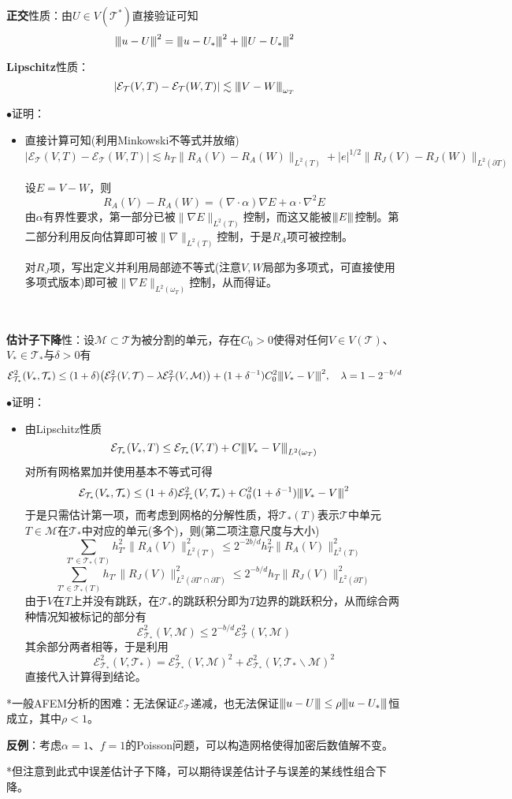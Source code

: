 \documentclass[a4paper,UTF8,fontset=windows]{ctexart}
\newcommand*{\ce}{\mathcal{E}}
\newcommand*{\ct}{\mathcal{T}}
\newcommand{\proo}[1]{{\kaishu $\bullet$证明：
\begin{itemize}
    \item[] #1
\end{itemize}
}}
\newcommand{\mm}[1]{{\left\vert\kern-0.25ex\left\vert\kern-0.25ex\left\vert #1 \right\vert\kern-0.25ex\right\vert\kern-0.25ex\right\vert}}
\begin{document}
\textbf{正交}性质：由$U\in V(\ct^*)$直接验证可知
$$\mm{u-U}^2=\mm{u-U_*}^2+\mm{U-U_*}^2$$

\textbf{Lipschitz}性质：
$$|\ce_\ct(V,T)-\ce_\ct(W,T)|\lesssim\mm{V-W}_{\omega_T}$$

\proo{
    直接计算可知(利用Minkowski不等式并放缩)
    $$|\ce_\ct(V,T)-\ce_\ct(W,T)|\lesssim h_T\|R_A(V)-R_A(W)\|_{L^2(T)}+|e|^{1/2}\|R_J(V)-R_J(W)\|_{L^2(\partial T)}$$

    设$E=V-W$，则
    $$R_A(V)-R_A(W)=(\nabla\cdot\alpha)\nabla E+\alpha\cdot\nabla^2E$$
    由$\alpha$有界性要求，第一部分已被$\|\nabla E\|_{L^2(T)}$控制，而这又能被$\mm{E}$控制。第二部分利用反向估算即可被$\|\nabla\|_{L^2(T)}$控制，于是$R_A$项可被控制。

    对$R_J$项，写出定义并利用局部迹不等式(注意$V,W$局部为多项式，可直接使用多项式版本)即可被$\|\nabla E\|_{L^2(\omega_T)}$控制，从而得证。
}

\

\textbf{估计子下降}性：设$\mathcal{M}\subset\ct$为被分割的单元，存在$C_0>0$使得对任何$V\in V(\ct)$、$V_*\in\ct_*$与$\delta>0$有
$$\ce_{\ct_*}^2(V_*,\ct_*)\le(1+\delta)\big(\ce_\ct^2(V,\ct)-\lambda\ce_\ct^2(V,\mathcal{M})\big)+(1+\delta^{-1})C_0^2\mm{V_*-V}^2,\quad\lambda=1-2^{-b/d}$$

\proo{
    由Lipschitz性质
    $$\ce_{\ct_*}(V_*,T)\le\ce_{\ct_*}(V,T)+C\mm{V_*-V}_{L^2(\omega_T)}$$
    对所有网格累加并使用基本不等式可得
    $$\ce_{\ct_*}(V_*,\ct_*)\le(1+\delta)\ce_{\ct_*}^2(V,\ct_*)+C_0^2(1+\delta^{-1})\mm{V_*-V}^2$$
    于是只需估计第一项，而考虑到网格的分解性质，将$\ct_*(T)$表示$\ct$中单元$T\in\mathcal{M}$在$\ct_*$中对应的单元(多个)，则(第二项注意尺度与大小)
    $$\sum_{T'\in\ct_*(T)}h_{T'}^2\|R_A(V)\|_{L^2(T')}^2\le 2^{-2b/d}h_T^2\|R_A(V)\|_{L^2(T)}^2$$
    $$\sum_{T'\in\ct_*(T)}h_{T'}\|R_J(V)\|_{L^2(\partial T'\cap\partial T)}^2\le 2^{-b/d}h_T\|R_J(V)\|_{L^2(\partial T)}^2$$
    由于$V$在$T$上并没有跳跃，在$\ct_*$的跳跃积分即为$T$边界的跳跃积分，从而综合两种情况知被标记的部分有
    $$\ce_{\ct_*}^2(V,\mathcal{M})\le 2^{-b/d}\ce_\ct^2(V,\mathcal{M})$$
    其余部分两者相等，于是利用
    $$\ce_{\ct_*}^2(V,\ct_*)=\ce_{\ct_*}^2(V,\mathcal{M})^2+\ce_{\ct_*}^2(V,\ct_*\backslash\mathcal{M})^2$$
    直接代入计算得到结论。
}

*一般AFEM分析的困难：无法保证$\ce_\ct$递减，也无法保证$\mm{u-U}\le\rho\mm{u-U_*}$恒成立，其中$\rho<1$。

\textbf{反例}：考虑$\alpha=1$、$f=1$的Poisson问题，可以构造网格使得加密后数值解不变。

*但注意到此式中误差估计子下降，可以期待误差估计子与误差的某线性组合下降。
\end{document}
